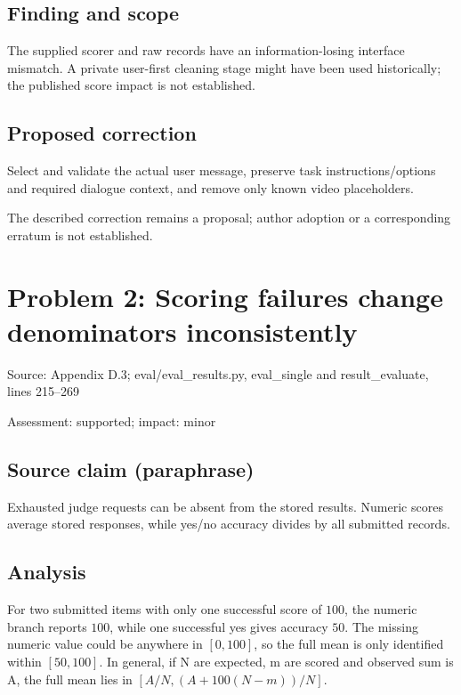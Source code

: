 \documentclass[11pt]{article}
\begin{document}
\subsection*{Finding and scope}

The supplied scorer and raw records have an information-losing interface mismatch. A private user-first cleaning stage might have been used historically; the published score impact is not established.

\subsection*{Proposed correction}

Select and validate the actual user message, preserve task instructions/options and required dialogue context, and remove only known video placeholders.

The described correction remains a proposal; author adoption or a corresponding erratum is not established.

\section*{Problem 2: Scoring failures change denominators inconsistently}

Source: Appendix D.3; eval/eval\_results.py, eval\_single and result\_evaluate, lines 215–269

Assessment: supported; impact: minor

\subsection*{Source claim (paraphrase)}

Exhausted judge requests can be absent from the stored results. Numeric scores average stored responses, while yes/no accuracy divides by all submitted records.

\subsection*{Analysis}

For two submitted items with only one successful score of \(100\), the numeric branch reports \(100\), while one successful yes gives accuracy \(50\). The missing numeric value could be anywhere in \([0,100]\), so the full mean is only identified within \([50,100]\). In general, if N are expected, m are scored and observed sum is A, the full mean lies in \([A/N,(A+100(N-m))/N]\).
\end{document}

